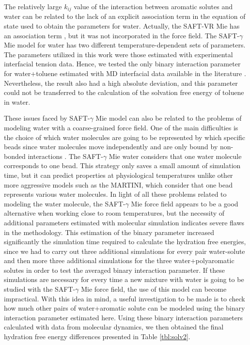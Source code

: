 The relatively large $k_{ij}$ value of the interaction between aromatic solutes and water can be related to the lack of an explicit association term in the equation of state used to obtain the parameters for water. Actually, the SAFT-VR Mie has an association term \cite{lafitte2013}, but it was not incorporated in the force field. The SAFT-$\gamma$ Mie model for water \cite{lobanova2016} has two different temperature-dependent sets of parameters. The parameters utilized in this work were those estimated with experimental interfacial tension data. Hence, we tested the only binary interaction parameter for water+toluene estimated with MD interfacial data available in the literature \cite{herdes2017}. Nevertheless, the result also had a high absolute deviation, and this parameter could not be transferred to the calculation of the solvation free energy of toluene in water. 

These issues faced by SAFT-$\gamma$ Mie model can also be related to the problems of modeling water with a coarse-grained force field. One of the main difficulties is the choice of which water molecules are going to be represented by which specific beads since water molecules move independently and are only bound by non-bonded interactions \cite{hadley2010,hadley2012}. The  SAFT-$\gamma$ Mie water considers that one water molecule corresponds to one bead. This strategy only saves a small amount of simulation time, but it can predict properties at physiological temperatures unlike other more aggressive models such as the MARTINI, which consider that one bead represents various water molecules. In light of all these problems related to modeling the water molecule, the SAFT-$\gamma$ Mie force field appears to be a good alternative when working close to room temperatures, but the necessity of additional parameters estimated with molecular simulation indicates severe flaws in the methodology. This estimation of the binary parameter increased significantly the simulation time required to calculate the hydration free energies, since we had to carry out three additional simulations for every pair water-solute and then more three additional simulations for the three water+polyaromatic solutes in order to test the averaged binary interaction parameter. If these simulations are necessary for every time a new mixture with water is going to be studied with the SAFT-$\gamma$ Mie force field, the use of this model can become impractical.  With this idea in mind, a useful investigation to be made is to check how much other pairs of water+aromatic solute can be modeled using the binary interaction parameter estimated here. Using these binary interaction parameters calculated with data from molecular dynamics, we then obtained the final hydration free energy differences presented in Table \ref{tbl:solv2}. 

